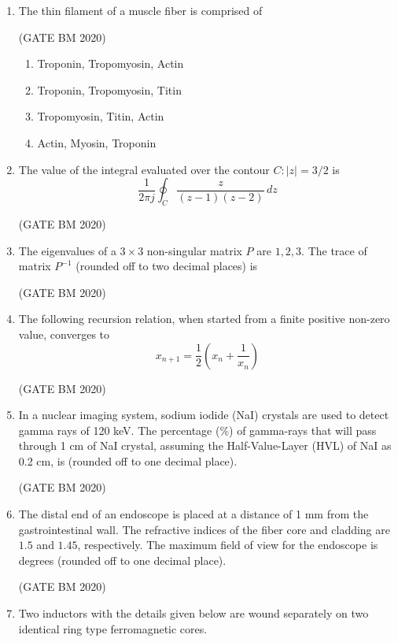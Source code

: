 \documentclass[journal]{IEEEtran}
\begin{document}
\begin{enumerate}
\item The thin filament of a muscle fiber is comprised of



	\hfill(GATE BM 2020)
\begin{enumerate}
    \item Troponin, Tropomyosin, Actin
    \item Troponin, Tropomyosin, Titin
    \item Tropomyosin, Titin, Actin
    \item Actin, Myosin, Troponin
\end{enumerate}


\item The value of the integral evaluated over the contour $C: |z|=3/2$ is
\[
\frac{1}{2\pi j}\oint_C \frac{z}{(z-1)(z-2)}\,dz
\]


\hfill(GATE BM 2020)
\item The eigenvalues of a $3\times 3$ non-singular matrix $P$ are $1,2,3$. The trace of matrix $P^{-1}$ (rounded off to two decimal places) is \underline{\hspace{2cm}}


	\hfill(GATE BM 2020)
\item The following recursion relation, when started from a finite positive non-zero value, converges to \underline{\hspace{2cm}}
\[
x_{n+1} = \frac{1}{2}\left(x_n + \frac{1}{x_n}\right)
\]

\hfill(GATE BM 2020)

\item In a nuclear imaging system, sodium iodide (NaI) crystals are used to detect gamma rays of 120 keV. The percentage (\%) of gamma-rays that will pass through 1 cm of NaI crystal, assuming the Half-Value-Layer (HVL) of NaI as 0.2 cm, is \underline{\hspace{2cm}} (rounded off to one decimal place).

	\hfill(GATE BM 2020)

\item The distal end of an endoscope is placed at a distance of 1 mm from the gastrointestinal wall. The refractive indices of the fiber core and cladding are $1.5$ and $1.45$, respectively. The maximum field of view for the endoscope is \underline{\hspace{2cm}} degrees (rounded off to one decimal place).


	\hfill(GATE BM 2020)


\item Two inductors with the details given below are wound separately on two identical ring type ferromagnetic cores.  


\end{enumerate}
\end{document}
